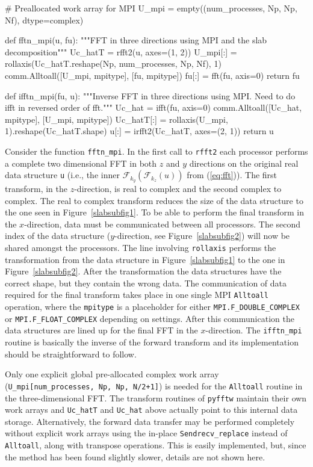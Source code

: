 \documentclass[11pt, oneside]{article}
\newcommand{\inpyth}{\lstinline[keywordstyle={}, basicstyle=\ttfamily]} %[]%
\begin{document}
\begin{python}
# Preallocated work array for MPI
U_mpi = empty((num_processes, Np, Np, Nf), dtype=complex)

def fftn_mpi(u, fu):
    """FFT in three directions using MPI and the slab decomposition"""
    Uc_hatT = rfft2(u, axes=(1, 2))
    U_mpi[:] = rollaxis(Uc_hatT.reshape(Np, num_processes, Np, Nf), 1)
    comm.Alltoall([U_mpi, mpitype], [fu, mpitype])
    fu[:] = fft(fu, axis=0)
    return fu

def ifftn_mpi(fu, u):
    """Inverse FFT in three directions using MPI.
       Need to do ifft in reversed order of fft."""
    Uc_hat = ifft(fu, axis=0)
    comm.Alltoall([Uc_hat, mpitype], [U_mpi, mpitype])
    Uc_hatT[:] = rollaxis(U_mpi, 1).reshape(Uc_hatT.shape)
    u[:] = irfft2(Uc_hatT, axes=(2, 1))
    return u
\end{python}
Consider the function \inpyth{fftn_mpi}. In the first call to \inpyth{rfft2} each processor performs a
complete two dimensional FFT in both $z$ and $y$ directions on the original real data structure \inpyth{u}
(i.e., the inner $\mathcal{F}_{k_y}(\mathcal{F}_{k_z}(u))$ from (\ref{eq:fft})).
The first transform, in the $z$-direction, is real to complex and the second complex to complex. The real
to complex transform reduces the size of the data structure to the one seen in Figure~\ref{slabsubfig1}.
To be able to perform the final transform in the $x$-direction, data must be communicated between all
processors. The second index of the data structure ($y$-direction, see Figure~\ref{slabsubfig2}) will now be
shared amongst the processors. The line involving \inpyth{rollaxis} performs
the transformation from the data structure in Figure~\ref{slabsubfig1} to the one in Figure~\ref{slabsubfig2}.
After the transformation the data structures have the correct shape, but they contain the wrong data. The
communication of data required for the final transform takes place in one single MPI \inpyth{Alltoall}
operation, where the \inpyth{mpitype} is a placeholder for either \inpyth{MPI.F_DOUBLE_COMPLEX} or
\inpyth{MPI.F_FLOAT_COMPLEX} depending on settings. After this communication the data structures are lined
up for the final FFT in the $x$-direction. The \inpyth{ifftn_mpi} routine is basically the inverse of the
forward transform and its implementation should be straightforward to follow.

Only one explicit global pre-allocated complex work array (\inpyth{U_mpi[num_processes, Np, Np, N/2+1]}) is needed for the \inpyth{Alltoall} routine in the three-dimensional FFT. The transform routines of \inpyth{pyfftw} maintain their own work arrays and \inpyth{Uc_hatT} and \inpyth{Uc_hat} above actually point to this internal data storage. Alternatively, the forward data transfer may be 
performed completely without explicit work arrays using the in-place \inpyth{Sendrecv_replace} instead of 
\inpyth{Alltoall}, along with transpose operations. This is easily implemented, but, since the method has been found slightly slower, details are not shown here.
\end{document}
